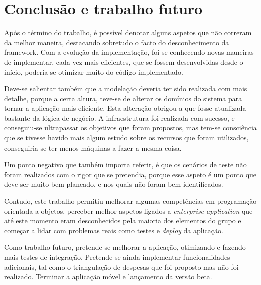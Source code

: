 \chapter[Conclusão e trabalho futuro]
{Conclus\~ao e trabalho futuro}

Após o término do trabalho, é possível denotar alguns aspetos que não correram da melhor maneira, destacando sobretudo o facto do desconhecimento da framework. Com a evolução da implementação, foi se conhecendo novas maneiras de implementar, cada vez mais eficientes, que se fossem desenvolvidas desde o início, poderia se otimizar muito do código implementado.

Deve-se salientar também que a modelação deveria ter sido realizada com mais detalhe, porque a certa altura, teve-se de alterar os domínios do sistema para tornar a aplicação mais eficiente. Esta alteração obrigou a que fosse atualizada bastante da lógica de negócio.
A infraestrutura foi realizada com sucesso, e conseguiu-se ultrapassar os objetivos que foram propostos, mas tem-se consciência que se tivesse havido mais algum estudo sobre os recursos que foram utilizados, conseguiria-se ter menos máquinas a fazer a mesma coisa.

Um ponto negativo que também importa referir, é que os cenários de teste não foram realizados com o rigor que se pretendia, porque esse aspeto é um ponto que deve ser muito bem planeado, e nos quais não foram bem identificados.

Contudo, este trabalho permitiu melhorar algumas competências em programação orientada a objetos, perceber melhor aspetos ligados a \textit{enterprise application} que até este momento eram desconhecidos pela maioria dos elementos do grupo e começar a lidar com problemas reais como testes e \textit{deploy} da aplicação.

Como trabalho futuro, pretende-se melhorar a aplicação, otimizando e fazendo mais testes de integração. Pretende-se ainda implementar funcionalidades adicionais, tal como o triangulação de despesas que foi proposto mas não foi realizado. Terminar a aplicação móvel e lançamento da versão beta.
